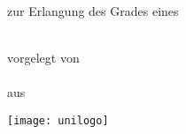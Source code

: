%
%
%

\begin{titlepage}
\setcounter{page}{-1}
\centering
\begin{Large}
\bfseries\Titel\par
\end{Large}

\vspace*{\fill}

\begin{large}
\textbf{\Typ}\\
zur Erlangung des Grades eines\\
\Grad\ \Fach\par
\end{large}

\vspace*{\fill}

\begin{large}
vorgelegt von\\
\textbf{\Name}\\
aus \Geburtsort\par
\end{large}

\vspace*{\fill}

\texttt{[image: unilogo]}

\vspace*{\fill}

\begin{large}
\Fakultaet\\
\Universitaet\\
\Ort\\
\Jahr\par
\end{large}
\end{titlepage}

